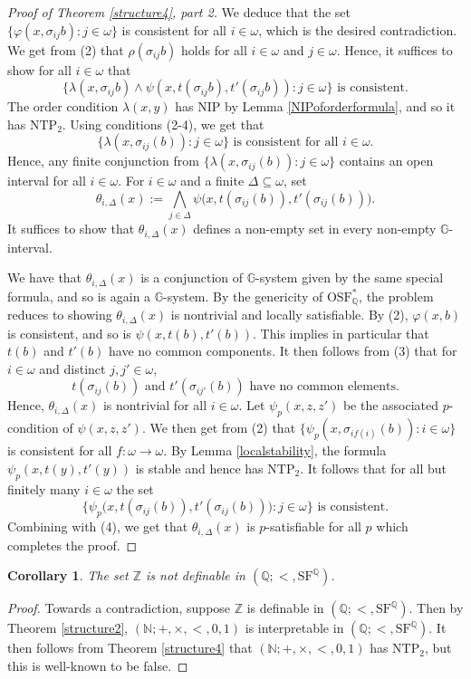 \documentclass[letterpaper]{amsart}
\newcommand{\qq}{\mathbb{Q}}
\newcommand{\nn}{\mathbb{N}}
\newcommand{\zz}{\mathbb{Z}}
\renewcommand{\gg}{\mathbb{G}}
\newcommand{\SQ}{\mathrm{SF}^\qq}
\newcommand{\TOSFQ}{\mathrm{OSF}^*_{\qq}}
\newtheorem{cor}[thm]{Corollary}
\begin{document}
\begin{proof}[Proof of Theorem \ref{structure4}, part 2]
We deduce that the  set $\{ \varphi(x, \sigma_{ij}b) : j \in \omega   \}$ is consistent for all $i \in \omega$, which is the desired contradiction. We get from (2) that $\rho(\sigma_{ij}b)$ holds for all $i \in \omega$ and $j \in \omega$. 
Hence, it suffices to show for all $i \in \omega$  that $$   \{   \lambda(x,\sigma_{ij}b) \wedge  \psi(x, t( \sigma_{ij}b), t'(\sigma_{ij} b)) : j \in \omega\}  \text{ is consistent}.$$ The order condition $\lambda(x, y)$ has $\text{NIP}$  by Lemma \ref{NIPoforderformula}, and so it has  $\text{NTP}_2$. Using conditions (2-4), we get that 
$$\{ \lambda(x, \sigma_{ij}(b)) : j \in \omega\} \text{ is consistent} \text{ for all } i\in \omega.$$ 
Hence, any finite conjunction from $\{\lambda(x, \sigma_{ij}(b)): j \in \omega\}$ contains an open interval for all $i \in \omega$. For $i \in \omega$ and a finite $\Delta \subseteq \omega$, set 
  $$ \theta_{i, \Delta}(x) := \bigwedge_{j \in \Delta}  \psi\big(x, t(\sigma_{ij}(b)),t'(\sigma_{ij}(b))\big).  $$
It suffices to show that $\theta_{i, \Delta}(x)$ defines a non-empty set in every non-empty $\gg$-interval.


We have that $\theta_{i, \Delta}(x)$ is a conjunction of $\gg$-system given by the same special formula, and so is again a $\gg$-system.
 By the genericity of $\TOSFQ$,  the problem reduces to showing $\theta_{i, \Delta}(x)$ is nontrivial and locally satisfiable.   
 By (2), $\varphi(x, b)$ is consistent, and so is  $\psi(x, t(b),t'(b))$. This implies in particular that $t(b)$ and $t'(b)$ have no common components.  It then follows from (3) that for $i \in \omega$ and distinct $j, j' \in \omega$, 
  $$t(\sigma_{ij}(b)) \text{ and } t'(\sigma_{ij'} (b)) \text{  have no common elements}.$$ Hence, $\theta_{i, \Delta}(x)$ is nontrivial for all $i \in \omega$. Let $\psi_p(x,z,z')$ be the associated $p$-condition of $\psi(x,z,z')$. We then get from (2) that $\{ \psi_p(x, \sigma_{if(i)}(b)): i \in \omega\}$ is consistent  for all $f: \omega \to \omega$. By Lemma \ref{localstability}, the formula $\psi_p(x, t(y),t'(y)  )$ is stable and hence has $\text{NTP}_2$.  It follows that for all but finitely many $i \in \omega$ the set 
  $$\{ \psi_p\big(x, t(\sigma_{ij} (b)), t'(\sigma_{ij} (b))\big) : j \in \omega\} \text{ is consistent}.$$ Combining with (4), we get that $\theta_{i, \Delta}(x)$ is  $p$-satisfiable for all $p$ which completes the proof.
  \end{proof}

\begin{cor}
The set $\zz$ is not definable in $(\qq; <, \SQ)$.
\end{cor}
\begin{proof}
Towards a contradiction, suppose $\zz$ is definable in $(\qq; <, \SQ)$. Then by Theorem \ref{structure2},  $(\nn; +, \times, <, 0, 1)$ is interpretable in $(\qq; <, \SQ)$. It then follows from Theorem \ref{structure4} that  $(\nn; +, \times, <, 0, 1)$ has  $\text{NTP}_2$, but this is well-known to be false.
\end{proof}
\end{document}
